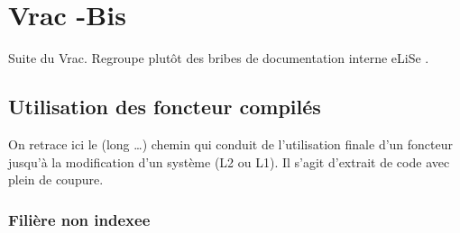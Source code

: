 \chapter{Vrac -Bis }

Suite du Vrac. Regroupe plut\^ot des  bribes de documentation interne
eLiSe .


\section{Utilisation des foncteur compil\'es}

On retrace ici le (long \dots) chemin qui conduit de l'utilisation
finale d'un foncteur jusqu'\`a la modification d'un syst\`eme (L2 ou L1).
Il s'agit d'extrait de code avec plein de coupure.

\subsection {Fili\`ere non indexee}

